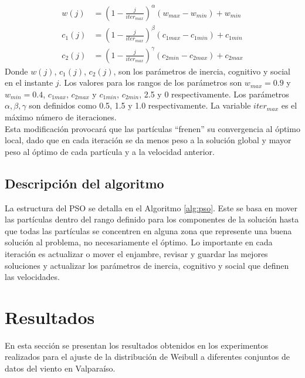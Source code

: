 \begin{align}\label{eq:VariationParameters}
    w(j) &= (1 - \frac{j}{iter_{max}})^{\alpha}(w_{max} - w_{min}) + w_{min}\\
    c_{1}(j) &= (1 - \frac{j}{iter_{max}})^{\beta}(c_{1max} - c_{1min}) + c_{1min}\\
    c_{2}(j) &= (1 - \frac{j}{iter_{max}})^{\gamma}(c_{2min} - c_{2max}) + c_{2max}
\end{align}    
Donde $w(j)$, $c_{1}(j)$, $c_{2}(j)$, son los parámetros de inercia, cognitivo y social en el instante $j$. Los valores para los rangos de los parámetros son $w_{max} = 0.9$ y $w_{min} = 0.4$, $c_{1max}$, $c_{2max}$ y $c_{1min}$, $c_{2min}$, 2.5 y 0 respectivamente. Los parámetros $\alpha, \beta, \gamma$ son definidos como 0.5, 1.5 y 1.0 respectivamente. La variable $iter_{max}$ es el máximo número de iteraciones. \\
Esta modificación provocará que las partículas ``frenen'' su convergencia al óptimo local, dado que en cada iteración se da menos peso a la solución global y mayor peso al óptimo de cada partícula y a la velocidad anterior.

\subsection{Descripción del algoritmo}
La estructura del PSO se detalla en el Algoritmo \ref{alg:pso}. Este se basa en mover las partículas dentro del rango definido para los componentes de la solución hasta que todas las partículas se concentren en alguna zona que represente una buena solución al problema, no necesariamente el óptimo. Lo importante en cada iteración es actualizar o mover el enjambre, revisar y guardar las mejores soluciones y actualizar los parámetros de inercia, cognitivo y social que definen las velocidades.

\section{Resultados}\label{sec:Experimentos_velocidad}
En esta sección se presentan los resultados obtenidos en los experimentos realizados para el ajuste de la distribución de Weibull a diferentes conjuntos de datos del viento en Valparaíso.
